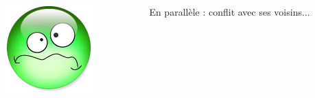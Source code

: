\documentclass[xcolor={x11names,svgnames},x11names,svgnames]{beamer}
\begin{document}
\begin{frame}[label=sparse_lu_MIS_3]
  \begin{columns}[c]
    \begin{column}{.1\textwidth}
      \includegraphics[width=\textwidth]{triste.png}
    \end{column}
    \begin{column}[c]{.9\textwidth}

      En parallèle : conflit avec ses voisins...
      
    \end{column}
  \end{columns}
\end{frame}

\end{document}
